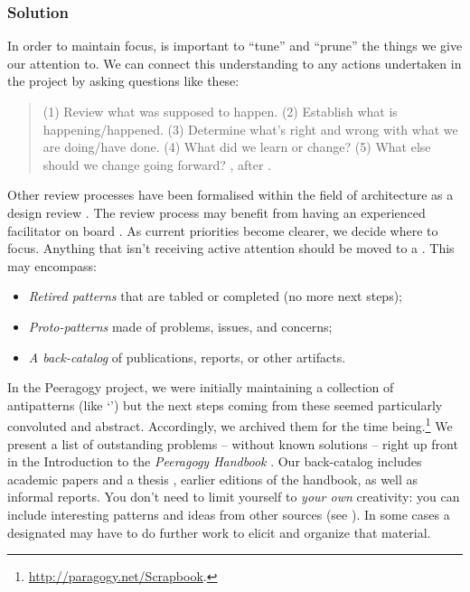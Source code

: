 \subsubsection*{Solution}
In order to maintain focus, is important to ``tune'' and ``prune'' the
things we give our attention to.  We can connect this understanding to
any actions undertaken in the project by asking questions like these:
\begin{quote}
(1) Review what was supposed to happen.
(2) Establish what is happening/happened.
(3) Determine what’s right and wrong with what we are doing/have done.
(4) What did we learn or change? 
(5) What else should we change going forward?  \cite[Chapter 28]{peeragogy-handbook}, after \cite{afteraction}.
\end{quote}
%
Other review processes have been formalised within the field of architecture
as a design review \cite{design-review}.  The review process may benefit from having an experienced
facilitator on board \cite[pp.~67, 142--143]{gabriel2002writer}.
As current priorities become clearer, we decide where to focus.
Anything that isn't receiving active attention should be moved to a
.  This may encompass:
\begin{itemize}
\item \emph{Retired patterns} that are tabled or completed (no more next steps);
\item \emph{Proto-patterns} made of problems, issues, and concerns;
\item \emph{A back-catalog} of publications, reports, or other
  artifacts.
\end{itemize}
In the Peeragogy project, we were initially maintaining a collection
of antipatterns (like `') but the
next steps coming from these seemed particularly convoluted and
abstract.  Accordingly, we archived them for the time
being.\footnote{\url{http://paragogy.net/Scrapbook}.}  We present a
list of outstanding problems -- without known solutions -- right up
front in the Introduction to the \emph{Peeragogy Handbook}
\cite[Chapter 1]{peeragogy-handbook}.  Our back-catalog includes
academic papers
\cite{building-peeragogy-accelerator,corneli2013inaction,corneli2012paragogical,paragogy-okcon}
and a thesis \cite{corneli-thesis}, earlier editions of the handbook,
as well as informal reports.
%
You don't need to limit
yourself to \emph{your own} creativity: you can include interesting
patterns and ideas from other sources (see ). In some cases a designated
 may have to do further work to elicit and
organize that material.

